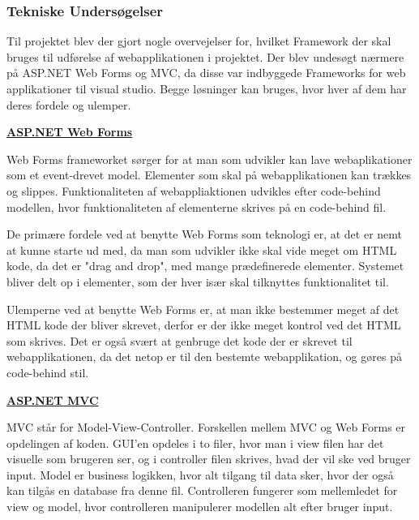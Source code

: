 \subsubsection{Tekniske Undersøgelser} 

\noindent Til projektet blev der gjort nogle overvejelser for, hvilket Framework der skal bruges til udførelse af webapplikationen i projektet. Der blev undesøgt nærmere på ASP.NET Web Forms og MVC, da disse var indbyggede Frameworks for web applikationer til visual studio. Begge løsninger kan bruges, hvor hver af dem har deres fordele og ulemper. \newline

\noindent \textbf{\underline{ASP.NET Web Forms}}

\noindent Web Forms frameworket sørger for at man som udvikler kan lave webaplikationer som et event-drevet model. Elementer som skal på webapplikationen kan trækkes og slippes. Funktionaliteten af webappliaktionen udvikles efter code-behind modellen, hvor funktionaliteten af elementerne skrives på en code-behind fil. \newline 

\noindent De primære fordele ved at benytte Web Forms som teknologi er, at det er nemt at kunne starte ud med, da man som udvikler ikke skal vide meget om HTML kode, da det er "drag and drop", med mange prædefinerede elementer.
Systemet bliver delt op i elementer, som der hver især skal tilknyttes funktionalitet til. \newline 

\noindent Ulemperne ved at benytte Web Forms er, at man ikke bestemmer meget af det HTML kode der bliver skrevet, derfor er der ikke meget kontrol ved det HTML som skrives. \newline
\noindent Det er også svært at genbruge det kode der er skrevet til webapplikationen, da det netop er til den bestemte webapplikation, og gøres på code-behind stil. \newline

\noindent \textbf{\underline{ASP.NET MVC}}

\noindent MVC står for Model-View-Controller. Forskellen mellem MVC og Web Forms er opdelingen af koden. GUI'en opdeles i to filer, hvor man i view filen har det visuelle som brugeren ser, og i controller filen skrives, hvad der vil ske ved bruger input. Model er business logikken, hvor alt tilgang til data sker, hvor der også kan tilgås en database fra denne fil. Controlleren fungerer som mellemledet for view og model, hvor controlleren manipulerer modellen alt efter bruger input. \newline

